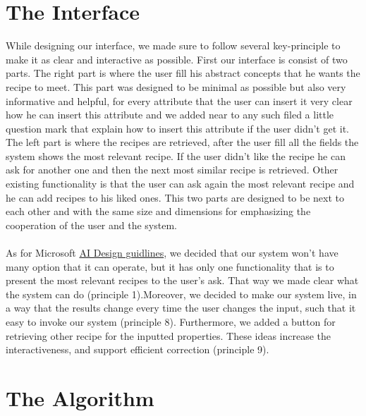 \documentclass[]{article}
\begin{document}
\section{The Interface}
While designing our interface, we made sure to follow several key-principle to make it as clear and interactive as possible.
First our interface is consist of two parts. The right part is where the user fill his abstract concepts that he wants the recipe to meet. This part was designed to be minimal as possible but also very informative and helpful, for every attribute that the user can insert it very clear how he can insert this attribute and we added near to any such filed a little question mark that explain how to insert this attribute if the user didn't get it. The left part is where the recipes are retrieved, after the user fill all the fields the system shows the most relevant recipe. If the user didn't like the recipe he can ask for another one and then the next most similar recipe is retrieved. Other existing functionality is that the user can ask again the most relevant recipe and he can add recipes to his liked ones. This two parts are designed to be next to each other and with the same size and dimensions for emphasizing the cooperation of the user and the system.\\\\
As for Microsoft \href{https://www.microsoft.com/en-us/haxtoolkit/uploads/prod/2021/05/AI-Design-guidelines_041519.pdf}{AI Design guidlines}, we decided that our system won't have many option that it can operate, but it has only one functionality that is to present the most relevant recipes to the user's ask. That way we made clear what the system can do (principle 1).Moreover, we decided to make our system live, in a way that the results change every time the user changes the input, such that it easy to invoke our system (principle 8). Furthermore, we added a button for retrieving other recipe for the inputted properties. These ideas increase the interactiveness, and support efficient correction (principle 9). 

\section{The Algorithm}
\end{document}
